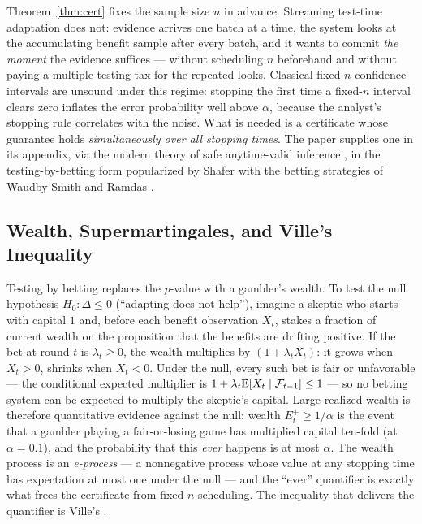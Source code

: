 Theorem~\ref{thm:cert} fixes the sample size $n$ in advance. Streaming test-time
adaptation does not: evidence arrives one batch at a time, the system looks at the
accumulating benefit sample after every batch, and it wants to commit \emph{the moment}
the evidence suffices --- without scheduling $n$ beforehand and without paying a
multiple-testing tax for the repeated looks. Classical fixed-$n$ confidence intervals
are unsound under this regime: stopping the first time a fixed-$n$ interval clears zero
inflates the error probability well above $\alpha$, because the analyst's stopping rule
correlates with the noise. What is needed is a certificate whose guarantee holds
\emph{simultaneously over all stopping times}. The paper supplies one in its appendix,
via the modern theory of safe anytime-valid inference
\cite{ramdas2023gametheoretic,howard2021timeuniform,grunwald2024safe}, in the
testing-by-betting form popularized by Shafer \cite{shafer2019game} with the betting
strategies of Waudby-Smith and Ramdas \cite{waudbysmith2024betting}.

\subsection{Wealth, Supermartingales, and Ville's Inequality}
\label{sec:t2-betting}

Testing by betting replaces the $p$-value with a gambler's wealth. To test the null
hypothesis $H_0:\Delta\le0$ (``adapting does not help''), imagine a skeptic who starts
with capital $1$ and, before each benefit observation $X_t$, stakes a fraction of
current wealth on the proposition that the benefits are drifting positive. If the bet
at round $t$ is $\lambda_t\ge0$, the wealth multiplies by $(1+\lambda_tX_t)$: it grows
when $X_t>0$, shrinks when $X_t<0$. Under the null, every such bet is fair or
unfavorable --- the conditional expected multiplier is
$1+\lambda_t\mathbb{E}[X_t\mid\mathcal F_{t-1}]\le1$ --- so no betting system can be expected
to multiply the skeptic's capital. Large realized wealth is therefore quantitative
evidence against the null: wealth $E^+_t\ge1/\alpha$ is the event that a gambler
playing a fair-or-losing game has multiplied capital ten-fold (at $\alpha=0.1$), and
the probability that this \emph{ever} happens is at most $\alpha$. The wealth process
is an \emph{e-process} --- a nonnegative process whose value at any stopping time has
expectation at most one under the null \cite{grunwald2024safe,ramdas2023gametheoretic}
--- and the ``ever'' quantifier is exactly what frees the certificate from fixed-$n$
scheduling. The inequality that delivers the quantifier is Ville's
\cite{ville1939etude}.

